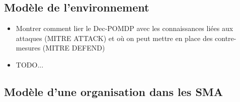 \documentclass{article}
\begin{document}
\subsection{Modèle de l'environnement}
\begin{itemize}

    \item Montrer comment lier le Dec-POMDP avec les connaissances liées aux attaques (MITRE ATTACK) et où on peut mettre en place des contre-mesures (MITRE DEFEND)
    \item TODO...
\end{itemize}

\subsection{Modèle d'une organisation dans les SMA}
\end{document}
